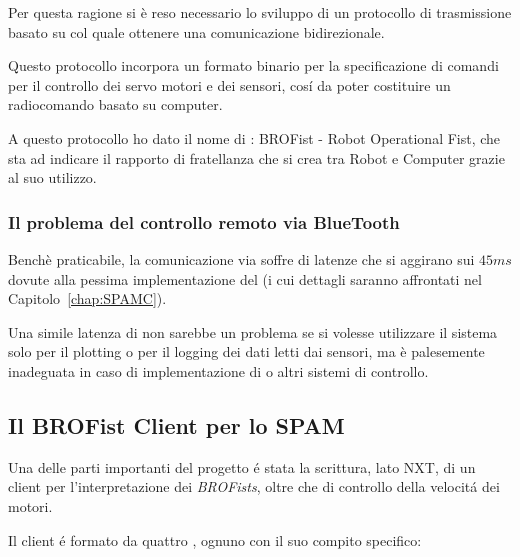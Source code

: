 Per questa ragione si \`e reso necessario lo sviluppo di un protocollo di
trasmissione basato su  col quale ottenere una
comunicazione bidirezionale.

Questo protocollo incorpora un formato binario per la
specificazione di comandi per il controllo dei servo motori e dei sensori,
cos\'i da poter costituire un radiocomando basato su computer.

A questo protocollo ho dato il nome di \BROFist{}: BROFist - Robot
Operational Fist, che sta ad indicare il rapporto di fratellanza che si
crea tra Robot e Computer grazie al suo utilizzo.

\subsubsection{Il problema del controllo remoto via BlueTooth}

Bench\`e praticabile, la comunicazione via  soffre di
latenze che si aggirano sui $45ms$ dovute alla pessima implementazione del
 (i cui dettagli saranno affrontati nel
Capitolo~\ref{chap:SPAMC}).

Una simile latenza di non sarebbe un problema se si volesse utilizzare
il sistema solo per il plotting o per il logging dei dati letti dai
sensori, ma \`e palesemente inadeguata in caso di implementazione di
 o altri sistemi di controllo.

\subsection{Il BROFist Client per lo SPAM}\label{sec:BROClient}

Una delle parti importanti del progetto \'e stata la scrittura, lato NXT,
di un client per l'interpretazione dei \emph{BROFists}, oltre che di
controllo della velocit\'a dei motori.

Il client \'e formato da quattro , ognuno con il suo
compito specifico:

